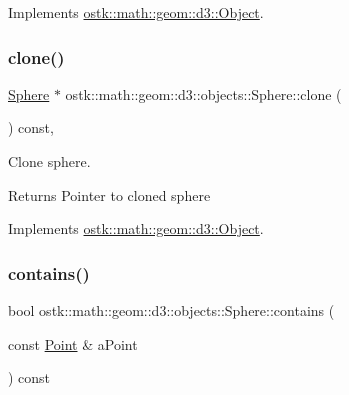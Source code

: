 Implements \hyperlink{classostk_1_1math_1_1geom_1_1d3_1_1_object_ae9194dd6d2bb4df09292ffc84dccdb1d}{ostk\+::math\+::geom\+::d3\+::\+Object}.

\mbox{\label{classostk_1_1math_1_1geom_1_1d3_1_1objects_1_1_sphere_a123c8f9f89be73d95db4a0c8dd8c1c7b}} 
\subsubsection{\texorpdfstring{clone()}{clone()}}
{\footnotesize\ttfamily \hyperlink{classostk_1_1math_1_1geom_1_1d3_1_1objects_1_1_sphere}{Sphere} $\ast$ ostk\+::math\+::geom\+::d3\+::objects\+::\+Sphere\+::clone (\begin{DoxyParamCaption}{ }\end{DoxyParamCaption}) const\hspace{0.3cm}{\ttfamily [override]}, {\ttfamily [virtual]}}



Clone sphere. 

\begin{DoxyReturn}{Returns}
Pointer to cloned sphere 
\end{DoxyReturn}


Implements \hyperlink{classostk_1_1math_1_1geom_1_1d3_1_1_object_a676013f9555f6492687f9809b2db887b}{ostk\+::math\+::geom\+::d3\+::\+Object}.

\mbox{\label{classostk_1_1math_1_1geom_1_1d3_1_1objects_1_1_sphere_a65299f7b2db42d3ad1b32fc70c9845ae}} 
\subsubsection{\texorpdfstring{contains()}{contains()}\hspace{0.1cm}{\footnotesize\ttfamily [1/2]}}
{\footnotesize\ttfamily bool ostk\+::math\+::geom\+::d3\+::objects\+::\+Sphere\+::contains (\begin{DoxyParamCaption}\item[{const \hyperlink{classostk_1_1math_1_1geom_1_1d3_1_1objects_1_1_point}{Point} \&}]{a\+Point }\end{DoxyParamCaption}) const}



